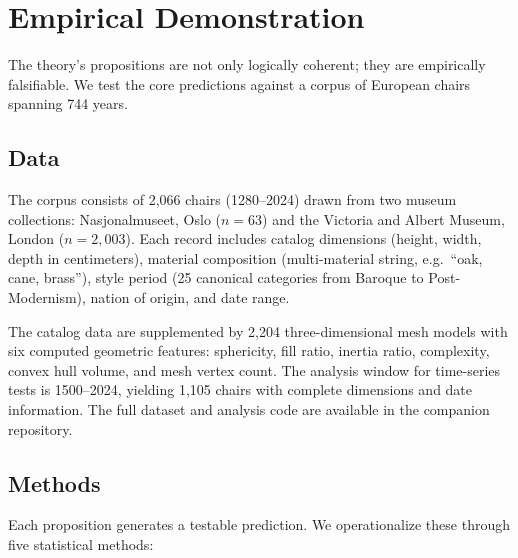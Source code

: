 \section{Empirical Demonstration}
\label{sec:empirical}

The theory's propositions are not only logically coherent; they are empirically falsifiable. We test the core predictions against a corpus of European chairs spanning 744 years.

\subsection{Data}

The corpus consists of 2,066 chairs (1280--2024) drawn from two museum collections: Nasjonalmuseet, Oslo ($n = 63$) and the Victoria and Albert Museum, London ($n = 2{,}003$). Each record includes catalog dimensions (height, width, depth in centimeters), material composition (multi-material string, e.g.\ ``oak, cane, brass''), style period (25 canonical categories from Baroque to Post-Modernism), nation of origin, and date range.

The catalog data are supplemented by 2,204 three-dimensional mesh models with six computed geometric features: sphericity, fill ratio, inertia ratio, complexity, convex hull volume, and mesh vertex count. The analysis window for time-series tests is 1500--2024, yielding 1,105 chairs with complete dimensions and date information. The full dataset and analysis code are available in the companion repository.

\subsection{Methods}

Each proposition generates a testable prediction. We operationalize these through five statistical methods:


